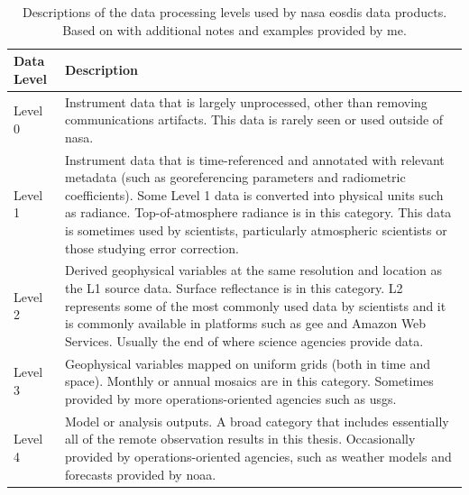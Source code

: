 \begin{table}[!htb]
\caption[NASA EOSDIS Data Processing Levels]{Descriptions of the data processing levels used by \ac{nasa} \ac{eosdis} data products. Based on \cite{earthsciencedatasystemsDataProcessingLevels2016} with additional notes and examples provided by me.}
\label{tab:data-processing-levels}
\begin{center}
\small
\begin{tabular}{ C{3cm}   L{8cm} } \hline
 
\textbf{Data Level} & \textbf{Description} \\ \hline

Level 0 & Instrument data that is largely unprocessed, other than removing communications artifacts. This data is rarely seen or used outside of \ac{nasa}. \\

Level 1 & Instrument data that is time-referenced and annotated with relevant metadata (such as georeferencing parameters and radiometric coefficients). Some Level 1 data is converted into physical units such as radiance. Top-of-atmosphere radiance is in this category. This data is sometimes used by scientists, particularly atmospheric scientists or those studying error correction. \\ 

Level 2 & Derived geophysical variables at the same resolution and location as the L1 source data. Surface reflectance is in this category. L2 represents some of the most commonly used data by scientists and it is commonly available in platforms such as \ac{gee} and Amazon Web Services. Usually the end of where science agencies provide data. \\

Level 3 & Geophysical variables mapped on uniform grids (both in time and space). Monthly or annual mosaics are in this category. Sometimes provided by more operations-oriented agencies such as \ac{usgs}. \\

Level 4 & Model or analysis outputs. A broad category that includes essentially all of the remote observation results in this thesis. Occasionally provided by operations-oriented agencies, such as weather models and forecasts provided by \ac{noaa}. \\ \hline

\end{tabular}
\end{center}
\end{table}

